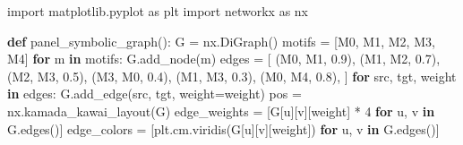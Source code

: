 \documentclass[
  11pt,
]{article}
\newenvironment{Shaded}{\begin{snugshade}}{\end{snugshade}}
\newcommand{\ControlFlowTok}[1]{\textcolor[rgb]{0.00,0.23,0.31}{\textbf{#1}}}
\newcommand{\DecValTok}[1]{\textcolor[rgb]{0.68,0.00,0.00}{#1}}
\newcommand{\FloatTok}[1]{\textcolor[rgb]{0.68,0.00,0.00}{#1}}
\newcommand{\ImportTok}[1]{\textcolor[rgb]{0.00,0.46,0.62}{#1}}
\newcommand{\KeywordTok}[1]{\textcolor[rgb]{0.00,0.23,0.31}{\textbf{#1}}}
\newcommand{\NormalTok}[1]{\textcolor[rgb]{0.00,0.23,0.31}{#1}}
\newcommand{\OperatorTok}[1]{\textcolor[rgb]{0.37,0.37,0.37}{#1}}
\newcommand{\StringTok}[1]{\textcolor[rgb]{0.13,0.47,0.30}{#1}}
\begin{document}
\begin{Shaded}
\begin{Highlighting}[]
\ImportTok{import}\NormalTok{ matplotlib.pyplot }\ImportTok{as}\NormalTok{ plt}
\ImportTok{import}\NormalTok{ networkx }\ImportTok{as}\NormalTok{ nx}

\KeywordTok{def}\NormalTok{ panel\_symbolic\_graph():}
\NormalTok{    G }\OperatorTok{=}\NormalTok{ nx.DiGraph()}
\NormalTok{    motifs }\OperatorTok{=}\NormalTok{ [}\StringTok{\textquotesingle{}M0\textquotesingle{}}\NormalTok{, }\StringTok{\textquotesingle{}M1\textquotesingle{}}\NormalTok{, }\StringTok{\textquotesingle{}M2\textquotesingle{}}\NormalTok{, }\StringTok{\textquotesingle{}M3\textquotesingle{}}\NormalTok{, }\StringTok{\textquotesingle{}M4\textquotesingle{}}\NormalTok{]}
    \ControlFlowTok{for}\NormalTok{ m }\KeywordTok{in}\NormalTok{ motifs:}
\NormalTok{        G.add\_node(m)}
\NormalTok{    edges }\OperatorTok{=}\NormalTok{ [}
\NormalTok{        (}\StringTok{\textquotesingle{}M0\textquotesingle{}}\NormalTok{, }\StringTok{\textquotesingle{}M1\textquotesingle{}}\NormalTok{, }\FloatTok{0.9}\NormalTok{),}
\NormalTok{        (}\StringTok{\textquotesingle{}M1\textquotesingle{}}\NormalTok{, }\StringTok{\textquotesingle{}M2\textquotesingle{}}\NormalTok{, }\FloatTok{0.7}\NormalTok{),}
\NormalTok{        (}\StringTok{\textquotesingle{}M2\textquotesingle{}}\NormalTok{, }\StringTok{\textquotesingle{}M3\textquotesingle{}}\NormalTok{, }\FloatTok{0.5}\NormalTok{),}
\NormalTok{        (}\StringTok{\textquotesingle{}M3\textquotesingle{}}\NormalTok{, }\StringTok{\textquotesingle{}M0\textquotesingle{}}\NormalTok{, }\FloatTok{0.4}\NormalTok{),}
\NormalTok{        (}\StringTok{\textquotesingle{}M1\textquotesingle{}}\NormalTok{, }\StringTok{\textquotesingle{}M3\textquotesingle{}}\NormalTok{, }\FloatTok{0.3}\NormalTok{),}
\NormalTok{        (}\StringTok{\textquotesingle{}M0\textquotesingle{}}\NormalTok{, }\StringTok{\textquotesingle{}M4\textquotesingle{}}\NormalTok{, }\FloatTok{0.8}\NormalTok{),}
\NormalTok{    ]}
    \ControlFlowTok{for}\NormalTok{ src, tgt, weight }\KeywordTok{in}\NormalTok{ edges:}
\NormalTok{        G.add\_edge(src, tgt, weight}\OperatorTok{=}\NormalTok{weight)}
\NormalTok{    pos }\OperatorTok{=}\NormalTok{ nx.kamada\_kawai\_layout(G)}
\NormalTok{    edge\_weights }\OperatorTok{=}\NormalTok{ [G[u][v][}\StringTok{\textquotesingle{}weight\textquotesingle{}}\NormalTok{] }\OperatorTok{*} \DecValTok{4} \ControlFlowTok{for}\NormalTok{ u, v }\KeywordTok{in}\NormalTok{ G.edges()]}
\NormalTok{    edge\_colors }\OperatorTok{=}\NormalTok{ [plt.cm.viridis(G[u][v][}\StringTok{\textquotesingle{}weight\textquotesingle{}}\NormalTok{]) }\ControlFlowTok{for}\NormalTok{ u, v }\KeywordTok{in}\NormalTok{ G.edges()]}

\end{Highlighting}
\end{Shaded}
\end{document}

